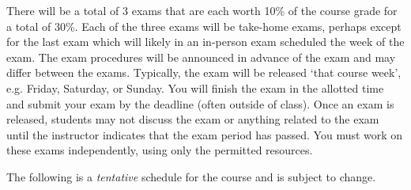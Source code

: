 \documentclass[11pt,letterpaper]{article}
\begin{document}
There will be a total of 3 exams that are each worth 10\% of the course grade for a total of 30\%. Each of the three exams will be take-home exams, perhaps except for the last exam which will likely in an in-person exam scheduled the week of the exam. The exam procedures will be announced in advance of the exam and may differ between the exams. Typically, the exam will be released `that course week', e.g. Friday, Saturday, or Sunday. You will finish the exam in the allotted time and submit your exam by the deadline (often outside of class). Once an exam is released, students may not discuss the exam or anything related to the exam until the instructor indicates that the exam period has passed. You must work on these exams independently, using only the permitted resources. \pspace


The following is a \emph{tentative} schedule for the course and is subject to change. 
        \begin{table}[!ht]
        \centering
        \end{table}
\end{document}
